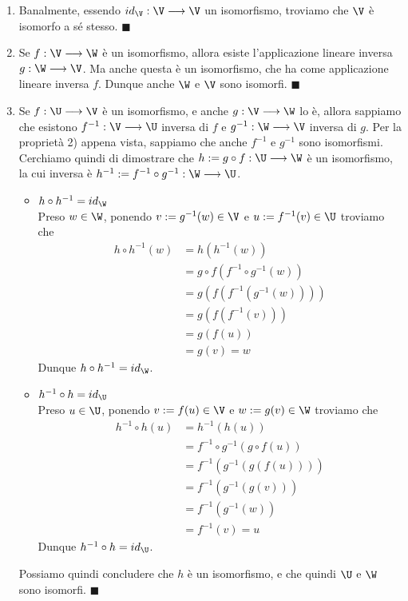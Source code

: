 \documentclass[11pt, a4paper, titlepage, oneside]{scrbook}
\begin{document}
\begin{enumerate}
    \item Banalmente, essendo $id_\V : \V \longrightarrow \V$ un isomorfismo, troviamo che $\V$ è isomorfo a sé stesso. $\blacksquare$
    \item Se $f: \V \longrightarrow \W$ è un isomorfismo, allora esiste l'applicazione lineare inversa $g: \W \longrightarrow \V$. Ma anche questa è un isomorfismo, che ha come applicazione lineare inversa $f$. Dunque anche $\W$ e $\V$ sono isomorfi. $\blacksquare$
    \item Se $f: \U \longrightarrow \V$ è un isomorfismo, e anche $g: \V \longrightarrow \W$ lo è, allora sappiamo che esistono $f^{-1}: \V \longrightarrow \U$ inversa di $f$ e $g^{-1}: \W \longrightarrow \V$ inversa di $g$. Per la proprietà 2) appena vista, sappiamo che anche $f^{-1}$ e $g^{-1}$ sono isomorfismi. Cerchiamo quindi di dimostrare che $h := g \circ f: \U \longrightarrow \W$ è un isomorfismo, la cui inversa è $h^{-1} := f^{-1} \circ g^{-1} : \W \longrightarrow \U$. 
    \begin{itemize}
        \item $h \circ h^{-1} = id_\W$ \\
        Preso $w \in \W$, ponendo $v := g^{-1}(w) \in \V$ e $u := f^{-1}(v) \in \U$ troviamo che \nopagebreak 
        \begin{align*}
         h \circ h^{-1} (w) &= h(h^{-1}(w)) \\
         &= g \circ f (f^{-1} \circ g^{-1}(w)) \\
         &= g(f(f^{-1}(g^{-1}(w)))) \\
         &=  g(f(f^{-1}(v))) \\
         &= g(f(u)) \\
         &= g(v) = w
        \end{align*}
        Dunque $h \circ h^{-1} = id_\W$.
        \item $h^{-1}\circ h = id_\U$ \\
        Preso $u \in \U$, ponendo $v := f(u) \in \V$ e $w := g(v) \in \W$ troviamo che \nopagebreak
        \begin{align*}
         h^{-1} \circ h (u) &= h^{-1}(h(u)) \\
         &= f^{-1} \circ g^{-1} (g \circ f(u)) \\
         &= f^{-1}(g^{-1}(g(f(u)))) \\
         &= f^{-1}(g^{-1}(g(v))) \\
         &= f^{-1}(g^{-1}(w)) \\
         &= f^{-1}(v) = u
        \end{align*}
        Dunque $h^{-1} \circ h = id_\U$.
    \end{itemize}
    Possiamo quindi concludere che $h$ è un isomorfismo, e che quindi $\U$ e $\W$ sono isomorfi. $\blacksquare$
\end{enumerate}
\end{document}

